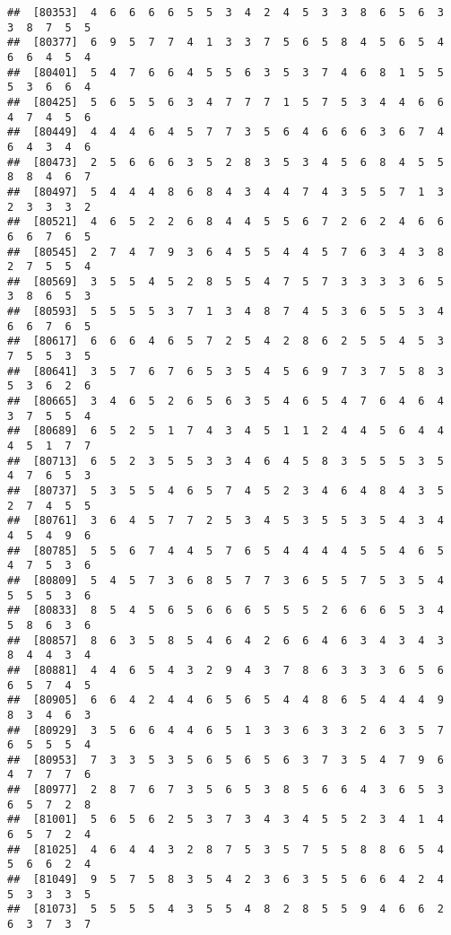 \documentclass[
]{book}
\begin{document}
\begin{verbatim}
##  [80353]  4  6  6  6  6  5  5  3  4  2  4  5  3  3  8  6  5  6  3  3  8  7  5  5
##  [80377]  6  9  5  7  7  4  1  3  3  7  5  6  5  8  4  5  6  5  4  6  6  4  5  4
##  [80401]  5  4  7  6  6  4  5  5  6  3  5  3  7  4  6  8  1  5  5  5  3  6  6  4
##  [80425]  5  6  5  5  6  3  4  7  7  7  1  5  7  5  3  4  4  6  6  4  7  4  5  6
##  [80449]  4  4  4  6  4  5  7  7  3  5  6  4  6  6  6  3  6  7  4  6  4  3  4  6
##  [80473]  2  5  6  6  6  3  5  2  8  3  5  3  4  5  6  8  4  5  5  8  8  4  6  7
##  [80497]  5  4  4  4  8  6  8  4  3  4  4  7  4  3  5  5  7  1  3  2  3  3  3  2
##  [80521]  4  6  5  2  2  6  8  4  4  5  5  6  7  2  6  2  4  6  6  6  6  7  6  5
##  [80545]  2  7  4  7  9  3  6  4  5  5  4  4  5  7  6  3  4  3  8  2  7  5  5  4
##  [80569]  3  5  5  4  5  2  8  5  5  4  7  5  7  3  3  3  3  6  5  3  8  6  5  3
##  [80593]  5  5  5  5  3  7  1  3  4  8  7  4  5  3  6  5  5  3  4  6  6  7  6  5
##  [80617]  6  6  6  4  6  5  7  2  5  4  2  8  6  2  5  5  4  5  3  7  5  5  3  5
##  [80641]  3  5  7  6  7  6  5  3  5  4  5  6  9  7  3  7  5  8  3  5  3  6  2  6
##  [80665]  3  4  6  5  2  6  5  6  3  5  4  6  5  4  7  6  4  6  4  3  7  5  5  4
##  [80689]  6  5  2  5  1  7  4  3  4  5  1  1  2  4  4  5  6  4  4  4  5  1  7  7
##  [80713]  6  5  2  3  5  5  3  3  4  6  4  5  8  3  5  5  5  3  5  4  7  6  5  3
##  [80737]  5  3  5  5  4  6  5  7  4  5  2  3  4  6  4  8  4  3  5  2  7  4  5  5
##  [80761]  3  6  4  5  7  7  2  5  3  4  5  3  5  5  3  5  4  3  4  4  5  4  9  6
##  [80785]  5  5  6  7  4  4  5  7  6  5  4  4  4  4  5  5  4  6  5  4  7  5  3  6
##  [80809]  5  4  5  7  3  6  8  5  7  7  3  6  5  5  7  5  3  5  4  5  5  5  3  6
##  [80833]  8  5  4  5  6  5  6  6  6  5  5  5  2  6  6  6  5  3  4  5  8  6  3  6
##  [80857]  8  6  3  5  8  5  4  6  4  2  6  6  4  6  3  4  3  4  3  8  4  4  3  4
##  [80881]  4  4  6  5  4  3  2  9  4  3  7  8  6  3  3  3  6  5  6  6  5  7  4  5
##  [80905]  6  6  4  2  4  4  6  5  6  5  4  4  8  6  5  4  4  4  9  8  3  4  6  3
##  [80929]  3  5  6  6  4  4  6  5  1  3  3  6  3  3  2  6  3  5  7  6  5  5  5  4
##  [80953]  7  3  3  5  3  5  6  5  6  5  6  3  7  3  5  4  7  9  6  4  7  7  7  6
##  [80977]  2  8  7  6  7  3  5  6  5  3  8  5  6  6  4  3  6  5  3  6  5  7  2  8
##  [81001]  5  6  5  6  2  5  3  7  3  4  3  4  5  5  2  3  4  1  4  6  5  7  2  4
##  [81025]  4  6  4  4  3  2  8  7  5  3  5  7  5  5  8  8  6  5  4  5  6  6  2  4
##  [81049]  9  5  7  5  8  3  5  4  2  3  6  3  5  5  6  6  4  2  4  5  3  3  3  5
##  [81073]  5  5  5  5  4  3  5  5  4  8  2  8  5  5  9  4  6  6  2  6  3  7  3  7

\end{verbatim}
\end{document}
